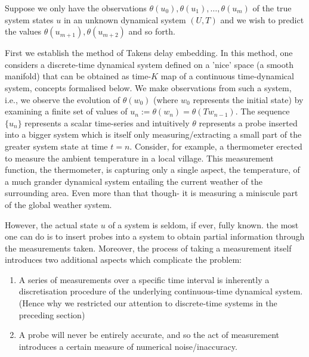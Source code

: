 \documentclass[a4paper,12pt,twoside]{report}
\begin{document}
Suppose we only have the observations $\theta(u_0), \theta(u_1), \ldots, \theta(u_m)$ of the true system states $u$ in an unknown dynamical system $(U,T)$ and we wish to predict the values $\theta(u_{m+1}), \theta(u_{m+2})$ and so forth.

First we establish the method of Takens delay embedding. 
In this method, one considers a discrete-time dynamical system defined on a 'nice' space (a smooth manifold) that can be obtained as time-$K$ map of a continuous time-dynamical system, concepts formalised below.
We make observations from such a system, i.e., we observe the evolution of $\theta(w_0)$ (where $w_0$ represents the initial state) by examining  a finite set of values of $u_n :=  \theta(w_n) = \theta(Tw_{n-1})$. The sequence $\{u_n\}$ represents a scalar time-series and intuitively $\theta$ represents a probe inserted into a bigger system which is itself only measuring/extracting a small part of the greater system state at time $t=n$. 
Consider, for example, a thermometer erected to measure the ambient temperature in a local village. This measurement function, the thermometer, is capturing only a single aspect, the temperature, of a much grander dynamical system entailing the current weather of the surrounding area. Even more than that though- it is measuring a miniscule part of the global weather system. 



However, the actual state $u$ of a system is seldom, if ever, fully known. the most one can do is to insert probes into a system to obtain partial information through the measurements taken. Moreover, the process of taking a measurement itself introduces two additional aspects which complicate the problem: 
\vspace{-8mm}
\begin{enumerate}[noitemsep, label=\roman*.]
  \item A series of measurements over a specific time interval is inherently a discretisation procedure of the underlying continuous-time dynamical system. (Hence why we restricted our attention to discrete-time systems in the preceding section)
  \item A probe will never be entirely accurate, and so the act of measurement introduces a certain measure of numerical noise/inaccuracy.
\end{enumerate}
\end{document}
